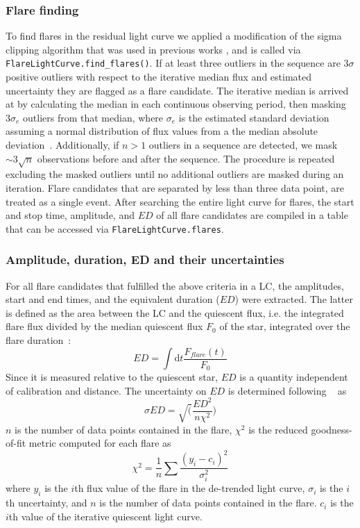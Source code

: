 \documentclass[twocolumn]{aastex62}
\begin{document}
\subsubsection{Flare finding}
To find flares in the residual light curve we applied a modification of the sigma clipping algorithm that was used in previous works \citep{chang2015, davenport2016, Ilin2019}, and is called via \texttt{FlareLightCurve.find\_flares()}. If at least three outliers in the sequence are $3\sigma$ positive outliers with respect to the iterative median flux and estimated uncertainty they are flagged as a flare candidate. The iterative median is arrived at by calculating the median in each continuous observing period, then masking $3\sigma_e$ outliers from that median, where $\sigma_e$ is the estimated standard deviation assuming a normal distribution of flux values from a the median absolute deviation~\citep{aigrain_software2016}. Additionally, if $n>1$ outliers in a sequence are detected, we mask $\sim3\sqrt{n}$ observations before and after the sequence. The procedure is repeated excluding the masked outliers until no additional outliers are masked during an iteration. Flare candidates that are separated by less than three data point, are treated as a single event. After searching the entire light curve for flares, the start and stop time, amplitude, and $ED$ of all flare candidates are compiled in a table that can be accessed via \texttt{FlareLightCurve.flares}. 
\subsubsection{Amplitude, duration, ED and their uncertainties}
For all flare candidates that fulfilled the above criteria in a LC, the amplitudes, start and end times, and the equivalent duration ($ED$) were extracted. The latter is defined as the area between the LC and the quiescent flux, i.e. the integrated flare flux divided by the median quiescent flux $F_0$ of the star, integrated over the flare duration~\citep{huntwalker2012}:
\begin{equation}
ED=\displaystyle \int \mathrm dt \frac{F_{flare}(t)}{F_0}
\end{equation}
Since it is measured relative to the quiescent star, $ED$ is a quantity independent of calibration and distance. The uncertainty on $ED$ is determined following ~\citet{davenport2016} as
\begin{equation}
\sigma ED = \sqrt(\frac{ED^2}{n\chi^2})
\end{equation}
$n$ is the number of data points contained in the flare, $\chi^2$ is the reduced goodness-of-fit metric computed for each flare as
\begin{equation}
\chi^2 = \frac{1}{n}\displaystyle\sum \frac{(y_i-c_i)^2}{\sigma_i^2}
\end{equation}
where $y_i$ is the $i$th flux value of the flare in the de-trended light curve, $\sigma_i$ is the $i$th uncertainty, and $n$ is the number of data points contained in the flare. $c_i$ is the $i$th value of the iterative quiescent light curve. 
\end{document}
